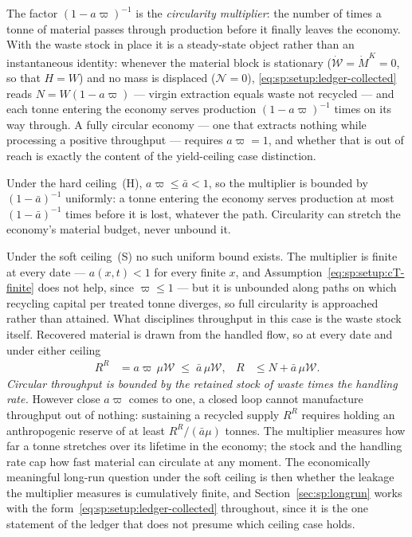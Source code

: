 The factor $\left(1-a\varpi\right)^{-1}$ is the \emph{circularity multiplier}: the number of times a tonne of material passes through production before it finally leaves the economy. With the waste stock in place it is a steady-state object rather than an instantaneous identity: whenever the material block is stationary ($\dot{\mathcal W}=\dot M^K=0$, so that $H=W$) and no mass is displaced ($\mathcal N=0$), \eqref{eq:sp:setup:ledger-collected} reads $N=W\left(1-a\varpi\right)$ --- virgin extraction equals waste not recycled --- and each tonne entering the economy serves production $\left(1-a\varpi\right)^{-1}$ times on its way through. A fully circular economy --- one that extracts nothing while processing a positive throughput --- requires $a\varpi=1$, and whether that is out of reach is exactly the content of the yield-ceiling case distinction.

Under the hard ceiling~(H), $a\varpi\le\bar a<1$, so the multiplier is bounded by $\left(1-\bar a\right)^{-1}$ uniformly: a tonne entering the economy serves production at most $\left(1-\bar a\right)^{-1}$ times before it is lost, whatever the path. Circularity can stretch the economy's material budget, never unbound it.

Under the soft ceiling~(S) no such uniform bound exists. The multiplier is finite at every date --- $a\left(x,t\right)<1$ for every finite $x$, and Assumption~\eqref{eq:sp:setup:cT-finite} does not help, since $\varpi\le1$ --- but it is unbounded along paths on which recycling capital per treated tonne diverges, so full circularity is approached rather than attained. What disciplines throughput in this case is the waste stock itself. Recovered material is drawn from the handled flow, so at every date and under either ceiling
\begin{align}
R^R &= a\varpi\,\mu\mathcal W \;\le\; \bar a\,\mu\mathcal W,
&
R &\le N+\bar a\,\mu\mathcal W .
\label{eq:sp:setup:throughput-cap}
\end{align}
\emph{Circular throughput is bounded by the retained stock of waste times the handling rate.} However close $a\varpi$ comes to one, a closed loop cannot manufacture throughput out of nothing: sustaining a recycled supply $R^R$ requires holding an anthropogenic reserve of at least $R^R/\left(\bar a\mu\right)$ tonnes. The multiplier measures how far a tonne stretches over its lifetime in the economy; the stock and the handling rate cap how fast material can circulate at any moment. The economically meaningful long-run question under the soft ceiling is then whether the leakage the multiplier measures is cumulatively finite, and Section~\ref{sec:sp:longrun} works with the form~\eqref{eq:sp:setup:ledger-collected} throughout, since it is the one statement of the ledger that does not presume which ceiling case holds.



